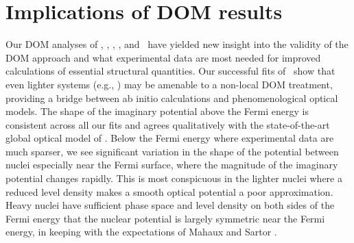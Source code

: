 \section{Implications of DOM results}
Our DOM analyses of \oSixEight, \caAughtEight, \niEightFour, \snTwelveFour,
and \pbEight\ have yielded new insight into the validity of the DOM approach
and what experimental data are most needed for improved calculations of
essential structural quantities. Our successful fits of \oSixEight\ show that
even lighter systems (e.g., \cTwelve) may be amenable to a non-local DOM
treatment, providing a bridge between ab initio calculations and
phenomenological optical models. The shape of the imaginary potential
above the Fermi energy is consistent across all our fits and agrees
qualitatively with the state-of-the-art global optical model of \cite{KoningDelaroche}. 
Below the Fermi energy where experimental data are much sparser, we see
significant variation in the shape of the potential between nuclei especially
near the Fermi surface, where the magnitude of the imaginary potential changes
rapidly. This is most conspicuous in the lighter nuclei where a reduced level density
makes a smooth optical potential a poor approximation.
Heavy nuclei have sufficient phase space and level density on both
sides of the Fermi energy that the nuclear potential is largely symmetric near
the Fermi energy, in keeping with the expectations of Mahaux and Sartor \cite{Mahaux1991}.

